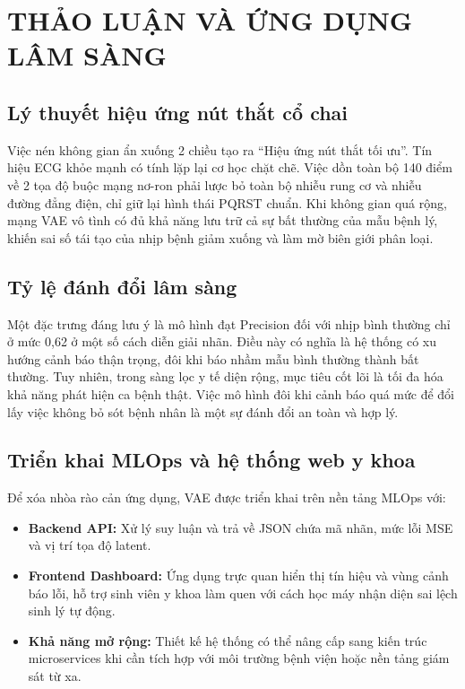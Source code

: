 \documentclass[conference]{IEEEtran}
\begin{document}
\section{THẢO LUẬN VÀ ỨNG DỤNG LÂM SÀNG}

\subsection{Lý thuyết hiệu ứng nút thắt cổ chai}
Việc nén không gian ẩn xuống 2 chiều tạo ra ``Hiệu ứng nút thắt tối ưu''. Tín hiệu ECG khỏe mạnh có tính lặp lại cơ học chặt chẽ. Việc dồn toàn bộ 140 điểm về 2 tọa độ buộc mạng nơ-ron phải lược bỏ toàn bộ nhiễu rung cơ và nhiễu đường đẳng điện, chỉ giữ lại hình thái PQRST chuẩn. Khi không gian quá rộng, mạng VAE vô tình có đủ khả năng lưu trữ cả sự bất thường của mẫu bệnh lý, khiến sai số tái tạo của nhịp bệnh giảm xuống và làm mờ biên giới phân loại.

\subsection{Tỷ lệ đánh đổi lâm sàng}
Một đặc trưng đáng lưu ý là mô hình đạt Precision đối với nhịp bình thường chỉ ở mức 0,62 ở một số cách diễn giải nhãn. Điều này có nghĩa là hệ thống có xu hướng cảnh báo thận trọng, đôi khi báo nhầm mẫu bình thường thành bất thường. Tuy nhiên, trong sàng lọc y tế diện rộng, mục tiêu cốt lõi là tối đa hóa khả năng phát hiện ca bệnh thật. Việc mô hình đôi khi cảnh báo quá mức để đổi lấy việc không bỏ sót bệnh nhân là một sự đánh đổi an toàn và hợp lý.

\subsection{Triển khai MLOps và hệ thống web y khoa}
Để xóa nhòa rào cản ứng dụng, VAE được triển khai trên nền tảng MLOps với:
\begin{itemize}
\item \textbf{Backend API:} Xử lý suy luận và trả về JSON chứa mã nhãn, mức lỗi MSE và vị trí tọa độ latent.
\item \textbf{Frontend Dashboard:} Ứng dụng trực quan hiển thị tín hiệu và vùng cảnh báo lỗi, hỗ trợ sinh viên y khoa làm quen với cách học máy nhận diện sai lệch sinh lý tự động.
\item \textbf{Khả năng mở rộng:} Thiết kế hệ thống có thể nâng cấp sang kiến trúc microservices khi cần tích hợp với môi trường bệnh viện hoặc nền tảng giám sát từ xa.
\end{itemize}
\end{document}
